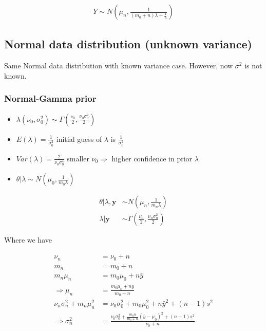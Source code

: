           \begin{align*}
              Y \sim N\left(\mu_n, \frac{1}{( m_0+n )\lambda +
              \frac{1}{\lambda}}\right)
          \end{align*}

          \subsection{Normal data distribution (unknown variance)}

          Same Normal data distribution with known variance
          case. However, now $\sigma^2$ is not known.

          \subsubsection{Normal-Gamma prior}

          \begin{itemize}
              \item $\lambda(\nu_0, \sigma_0^2) \sim \Gamma(\frac{\nu_0}{2},
                  \frac{\nu_0\sigma_0^2}{2})$
              \item $E(\lambda) =
                  \frac{1}{\sigma_0^2}$
                  \subitem initial guess of
                  $\lambda$ is $\frac{1}{\sigma_0^2}$
              \item $Var(\lambda) =
                  \frac{2}{\nu_0\sigma_0^4}$
                  \subitem smaller $\nu_0
                  \Rightarrow$ higher confidence in prior $\lambda$
              \item $\theta|\lambda \sim N(\mu_0,
                  \frac{1}{m_0\lambda})$
          \end{itemize}

          \begin{align*}
              \theta|\lambda, \mathbf{y} &\sim N\left(\mu_n,
              \frac{1}{m_n\lambda}\right)\\
                  \lambda|\mathbf{y} &\sim \Gamma\left(\frac{\nu_n}{2},
                  \frac{\nu_n\sigma_n^2}{2}\right)
          \end{align*}

          Where we have

          \begin{align*}
              \nu_n &= \nu_0 + n\\
              m_n &= m_0 + n\\
              m_n\mu_n &= m_0\mu_0 + n\bar{y}\\
              \Rightarrow \mu_n &=
              \frac{m_0\mu_0+n\bar{y}}{m_0+n}\\
              \nu_n\sigma_n^2 + m_n\mu_n^2 &= \nu_0\sigma_0^2 +
              m_0\mu_0^2 + n\bar{y}^2 + (n-1)s^2\\
              \Rightarrow \sigma_n^2 &= \frac{\nu_0\sigma_0^2 +
              \frac{m_0n}{m_0+n}(\bar{y}-\mu_0)^2+(n-1)s^2}{\nu_0+n}
          \end{align*}

